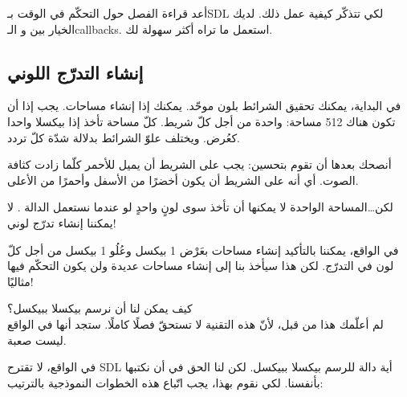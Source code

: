 أعد قراءة الفصل حول التحكّم في الوقت بـ\textenglish{SDL}
لكي تتذكّر كيفية عمل ذلك. لديك الخيار بين
و الـ\textenglish{callbacks}.
استعمل ما تراه أكثر سهولة لك.

\subsection{إنشاء التدرّج اللوني}

في البداية، يمكنك تحقيق الشرائط بلون موحّد. يمكنك إذا إنشاء مساحات. يجب إذا أن تكون هناك 512 مساحة: واحدة من أجل كلّ شريط. كلّ مساحة تأخذ إذا بيكسلا واحدا كعُرض. ويختلف علوّ الشرائط بدلالة شدّة كلّ تردد.

أنصحك بعدها أن تقوم بتحسين: يجب على الشريط أن يميل للأحمر كلّما زادت كثافة الصوت. أي أنه على الشريط أن يكون أخضرًا من الأسفل وأحمرًا من الأعلى.

\begin{question}
لكن\dots المساحة الواحدة لا يمكنها أن تأخذ سوى لونٍ واحدٍ لو عندما نستعمل الدالة
.
لا يمكننا إنشاء تدرّج لوني!
\end{question}

في الواقع، يمكننا بالتأكيد إنشاء مساحات بعَرْض 1 بيكسل وعُلُو 1 بيكسل من أجل كلّ لون في التدرّج. لكن هذا سيأخذ بنا إلى إنشاء مساحات عديدة ولن يكون التحكّم فيها مثاليًا!

كيف يمكن لنا أن نرسم بيكسلا ببيكسل؟\\
لم أعلّمك هذا من قبل، لأنّ هذه التقنية لا تستحقّ فصلًا كاملًا. ستجد أنها في الواقع ليست صعبة. 

في الواقع، لا تقترح \textenglish{SDL}
أية دالة للرسم بيكسلا ببيكسل. لكن لنا الحق في أن نكتبها بأنفسنا. لكي نقوم بهذا، يجب اتّباع هذه الخطوات النموذجية بالترتيب:

